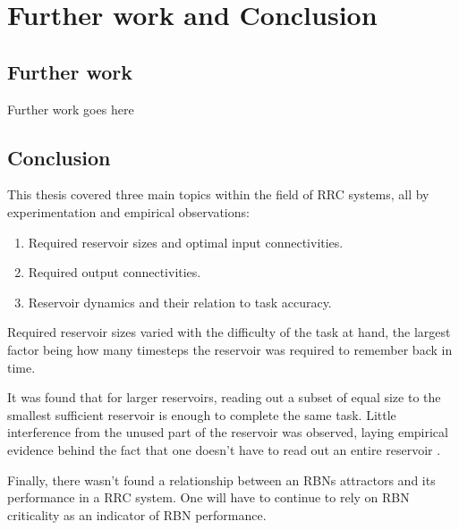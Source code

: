 \chapter{Further work and Conclusion}
\label{chapter:conclusion}

\section{Further work}

Further work goes here 

\section{Conclusion}

This thesis covered three main topics within the field of RRC systems,
all by experimentation and empirical observations:

\begin{enumerate}
    \item Required reservoir sizes and optimal input connectivities.
    \item Required output connectivities.
    \item Reservoir dynamics and their relation to task accuracy.
\end{enumerate}

Required reservoir sizes varied with the difficulty of the task at hand,
the largest factor being how many timesteps the reservoir was required to remember back in time.

It was found that for larger reservoirs, reading out a subset of equal size to the smallest sufficient reservoir is enough to complete the same task.
Little interference from the unused part of the reservoir was observed,
laying empirical evidence behind the fact that one doesn't have to read out an entire reservoir .

Finally, there wasn't found a relationship between an RBNs attractors and its performance in a RRC system.
One will have to continue to rely on RBN criticality as an indicator of RBN performance.

